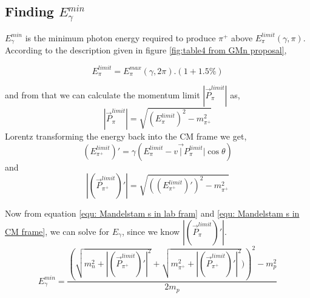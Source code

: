 \documentclass[11pt,letterpaper]{article}
\begin{document}
\begin{table}[h!]
    \centering
    \caption{Results I obtained for the same input parameters as in the proposal}
    \label{Threshold calculation results table}
\end{table}

\subsection{Finding  $E^{min}_\gamma$}\label{sec:E_gamma_min}
 $E^{min}_\gamma$ is the minimum photon energy required to produce $\pi^+$ above $E^{limit}_{\pi}(\gamma,\pi)$. According to the description given in figure \ref{fig:table4 from GMn proposal},

 \begin{equation}
    E^{limit}_{\pi} = E^{max}_{\pi}(\gamma,2\pi).(1 + 1.5\%)
 \end{equation}

and from that we can calculate the momentum limit $|\vec{P}^{limit}_{\pi}|$ as,
\begin{equation}
    |\vec{P}^{limit}_{\pi}| = \sqrt{ (E^{limit}_{\pi})^2 - m_{\pi^+}^2 }
\end{equation}
Lorentz transforming the energy back into the CM frame we get,
\begin{equation}
    (E^{limit}_{\pi^+})' = \gamma(E^{limit}_{\pi} - v\vec|{P}^{limit}_{\pi}|\cos{\theta})
\end{equation}
and 
\begin{equation}
    |(\vec{P}^{limit}_{\pi^+})'| = \sqrt{ ((E^{limit}_{\pi^+})')^2  - m_{\pi^+}^2 }
\end{equation}

Now from equation \ref{equ: Mandelstam s in lab fram} and \ref{equ: Mandelstam s in CM frame}, we can solve for $E_\gamma$, since we know $|(\vec{P}^{limit}_{\pi})'|$.
\begin{equation}
  E^{min}_\gamma  = \frac{ \left(\sqrt{m_n^2 + |(\vec{P}^{limit}_{\pi^+})'|^2} + \sqrt{m^2_{\pi^+} + |(\vec{P}^{limit}_{\pi^+})'|^2})\right)^2 - m_p^2}{2m_p}
\end{equation}

\subsection{}
\end{document}
